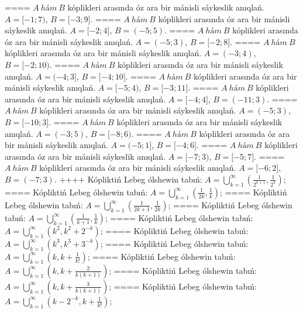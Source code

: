 ====
\(A\ hám\ B\) kóplikleri arasında óz ara bir mánisli sáykeslik anıqlań. \(A = \lbrack - 1;7)\), \(B = \lbrack - 3;9\rbrack\).
====
\(A\ hám\ B\) kóplikleri arasında óz ara bir mánisli sáykeslik anıqlań. \(A = \lbrack - 2;4\rbrack\), \(B = ( - 5;5)\).
====
\(A\ hám\ B\) kóplikleri arasında óz ara bir mánisli sáykeslik anıqlań. \(A = ( - 5;3)\), \(B = \lbrack - 2;8\rbrack\).
====
\(A\ hám\ B\) kóplikleri arasında óz ara bir mánisli sáykeslik anıqlań. \(A = ( - 3;4)\), \(B = \lbrack - 2;10)\).
====
\(A\ hám\ B\) kóplikleri arasında óz ara bir mánisli sáykeslik anıqlań. \(A = ( - 4;3\rbrack\), \(B = \lbrack - 4;10\rbrack\).
====
\(A\ hám\ B\) kóplikleri arasında óz ara bir mánisli sáykeslik anıqlań. \(A = \lbrack - 5;4)\), \(B = \lbrack - 3;11\rbrack\).
====
\(A\ hám\ B\) kóplikleri arasında óz ara bir mánisli sáykeslik anıqlań. \(A = \lbrack - 4;4\rbrack\), \(B = ( - 11;3)\).
====
\(A\ hám\ B\) kóplikleri arasında óz ara bir mánisli sáykeslik anıqlań. \(A = ( - 5;3)\), \(B = \lbrack - 10;3\rbrack\).
====
\(A\ hám\ B\) kóplikleri arasında óz ara bir mánisli sáykeslik anıqlań. \(A = ( - 3;5)\), \(B = \lbrack - 8;6)\).
====
\(A\ hám\ B\) kóplikleri arasında óz ara bir mánisli sáykeslik anıqlań. \(A = ( - 5;1\rbrack\), \(B = \lbrack - 4;6\rbrack\).
====
\(A\ hám\ B\) kóplikleri arasında óz ara bir mánisli sáykeslik anıqlań. \(A = \lbrack - 7;3)\), \(B = \lbrack - 5;7\rbrack\).
====
\(A\ hám\ B\) kóplikleri arasında óz ara bir mánisli sáykeslik anıqlań. \(A = \lbrack - 6;2\rbrack\), \(B = ( - 7;3)\).
++++
Kópliktiń Lebeg ólshewin tabıń: \(A = \bigcup_{k = 1}^{\infty}\left( \frac{1}{2^{k + 1}},\frac{1}{2^{k}} \right)\);
====
Kópliktiń Lebeg ólshewin tabıń: \(A = \bigcup_{k = 1}^{\infty}\left( \frac{1}{2k},\frac{1}{k} \right)\);
====
Kópliktiń Lebeg ólshewin tabıń: \(A = \bigcup_{k = 1}^{\infty}\left( \frac{1}{2k + 1},\frac{1}{2k} \right)\);
====
Kópliktiń Lebeg ólshewin tabıń: \(A = \bigcup_{k = 1}^{\infty}\left( \frac{1}{k + 1},\frac{1}{k} \right)\);
====
Kópliktiń Lebeg ólshewin tabıń: \(A = \bigcup_{k = 1}^{\infty}\left( k^{2},k^{2} + 2^{- k} \right)\);
====
Kópliktiń Lebeg ólshewin tabıń: \(A = \bigcup_{k = 1}^{\infty}\left( k^{3},k^{3} + 3^{- k} \right)\);
====
Kópliktiń Lebeg ólshewin tabıń: \(A = \bigcup_{k = 1}^{\infty}\left( k,k + \frac{1}{k!} \right)\);
====
Kópliktiń Lebeg ólshewin tabıń: \(A = \bigcup_{k = 1}^{\infty}\left( k,k + \frac{2}{k(k + 1)} \right)\);
====
Kópliktiń Lebeg ólshewin tabıń: \(A = \bigcup_{k = 1}^{\infty}\left( k,k + \frac{3}{k(k + 1)} \right)\);
====
Kópliktiń Lebeg ólshewin tabıń: \(A = \bigcup_{k = 1}^{\infty}\left( k - 2^{- k},k + \frac{1}{k!} \right)\);
